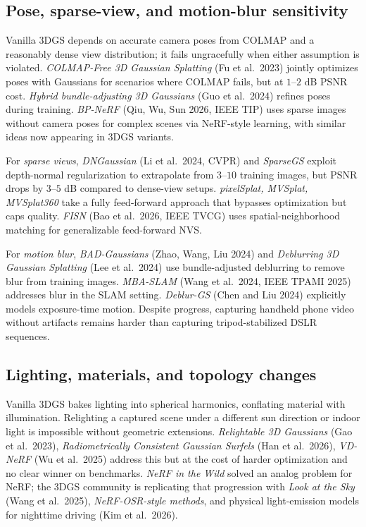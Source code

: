\documentclass{article}
\begin{document}
\subsection{Pose, sparse-view, and motion-blur sensitivity}\label{pose-sparse-view-and-motion-blur-sensitivity}

Vanilla 3DGS depends on accurate camera poses from COLMAP and a reasonably dense view distribution; it fails ungracefully when either assumption is violated. \emph{COLMAP-Free 3D Gaussian Splatting} (Fu et al.~2023) jointly optimizes poses with Gaussians for scenarios where COLMAP fails, but at \(1\)--\(2\) dB PSNR cost. \emph{Hybrid bundle-adjusting 3D Gaussians} (Guo et al.~2024) refines poses during training. \emph{BP-NeRF} (Qiu, Wu, Sun 2026, IEEE TIP) uses sparse images without camera poses for complex scenes via NeRF-style learning, with similar ideas now appearing in 3DGS variants.

For \emph{sparse views}, \emph{DNGaussian} (Li et al.~2024, CVPR) and \emph{SparseGS} exploit depth-normal regularization to extrapolate from \(3\)--\(10\) training images, but PSNR drops by \(3\)--\(5\) dB compared to dense-view setups. \emph{pixelSplat, MVSplat, MVSplat360} take a fully feed-forward approach that bypasses optimization but caps quality. \emph{FISN} (Bao et al.~2026, IEEE TVCG) uses spatial-neighborhood matching for generalizable feed-forward NVS.

For \emph{motion blur}, \emph{BAD-Gaussians} (Zhao, Wang, Liu 2024) and \emph{Deblurring 3D Gaussian Splatting} (Lee et al.~2024) use bundle-adjusted deblurring to remove blur from training images. \emph{MBA-SLAM} (Wang et al.~2024, IEEE TPAMI 2025) addresses blur in the SLAM setting. \emph{Deblur-GS} (Chen and Liu 2024) explicitly models exposure-time motion. Despite progress, capturing handheld phone video without artifacts remains harder than capturing tripod-stabilized DSLR sequences.

\subsection{Lighting, materials, and topology changes}\label{lighting-materials-and-topology-changes}

Vanilla 3DGS bakes lighting into spherical harmonics, conflating material with illumination. Relighting a captured scene under a different sun direction or indoor light is impossible without geometric extensions. \emph{Relightable 3D Gaussians} (Gao et al.~2023), \emph{Radiometrically Consistent Gaussian Surfels} (Han et al.~2026), \emph{VD-NeRF} (Wu et al.~2025) address this but at the cost of harder optimization and no clear winner on benchmarks. \emph{NeRF in the Wild} solved an analog problem for NeRF; the 3DGS community is replicating that progression with \emph{Look at the Sky} (Wang et al.~2025), \emph{NeRF-OSR-style methods}, and physical light-emission models for nighttime driving (Kim et al.~2026).
\end{document}
